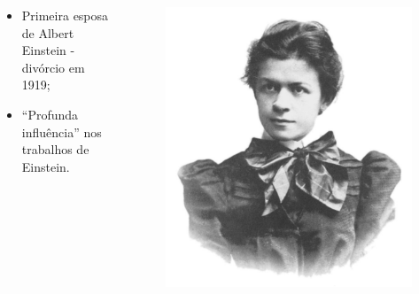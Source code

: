 \documentclass[11pt, brazil]{beamer}
\begin{document}
\begin{frame}
\begin{columns}
\begin{enumerate}
\begin{itemize}
   \item Primeira esposa de Albert Einstein - divórcio em 1919;
   \item ``Profunda influência'' nos trabalhos de Einstein.  
  \end{itemize}
\end{enumerate}
\begin{figure}
 \includegraphics[scale=0.37]{figuras/mileva.jpg}
\end{figure}
\end{columns}
\end{frame}

\end{document}
